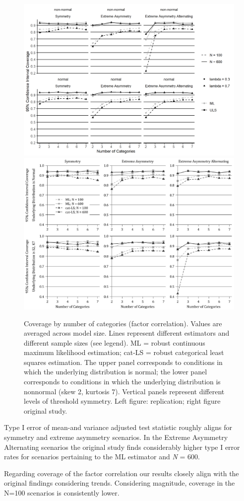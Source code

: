 \documentclass[10,a4paperpaper,]{article}
\begin{document}
\begin{figure}
\includegraphics[width=0.49\linewidth]{./figures/fig_8} \includegraphics[width=0.49\linewidth]{./figures/fig8_original} \caption{Coverage by number of categories (factor correlation). Values are averaged across model size. Lines represent different estimators and different sample sizes (see legend). ML = robust continuous maximum likelihood estimation; cat-LS = robust categorical least squares estimation. The upper panel corresponds to conditions in which the underlying distribution is normal; the lower panel corresponds to conditions in which the underlying distribution is nonnormal (skew 2, kurtosis 7). Vertical panels represent different levels of threshold symmetry. Left figure: replication; right figure original study.}\label{fig:fig8}
\end{figure}

Type I error of mean-and variance adjusted test statistic roughly aligns
for symmetry and extreme asymmetry scenarios. In the Extreme Asymmetry
Alternating scenarios the original study finds considerably higher type
I error rates for scenarios pertaining to the ML estimator and \emph{N}
= 600.

Regarding coverage of the factor correlation our results closely align
with the original findings considering trends. Considering magnitude,
coverage in the N=100 scenarios is consistently lower.
\end{document}
